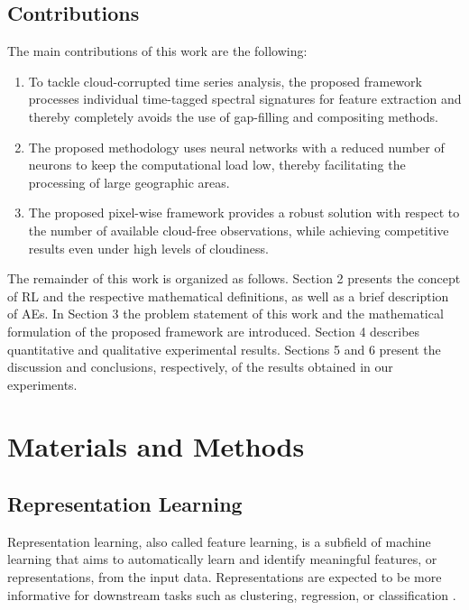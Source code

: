 \documentclass[journal,article,submit,pdftex,moreauthors]{Definitions/mdpi}
\begin{document}
\subsection{Contributions}
The main contributions of this work are the following:
\begin{enumerate}
	\item To tackle cloud-corrupted time series analysis, the proposed framework processes individual time-tagged spectral signatures for feature extraction and thereby completely avoids the use of gap-filling and compositing methods.
	\item The proposed methodology uses neural networks with a reduced number of neurons to keep the computational load low, thereby facilitating the processing of large geographic areas.
	\item The proposed pixel-wise framework provides a robust solution with respect to the number of available cloud-free observations, while achieving competitive results even under high levels of cloudiness.
\end{enumerate}

The remainder of this work is organized as follows. Section 2 presents the concept of RL and the respective mathematical definitions, as well as a brief description of AEs. 
In Section 3 the problem statement of this work and the mathematical formulation of the proposed framework are introduced. 
Section 4 describes quantitative and qualitative experimental results. 
Sections 5 and 6 present the discussion and conclusions, respectively, of the results obtained in our experiments.

\section{Materials and Methods}
\subsection{Representation Learning}
Representation learning, also called feature learning, is a subfield of machine learning
that aims to automatically learn and identify meaningful features, or representations, from the input data.
Representations are expected to be more informative for downstream tasks such as clustering, regression, or classification \cite{Tzelepi2022}. 
\end{document}
